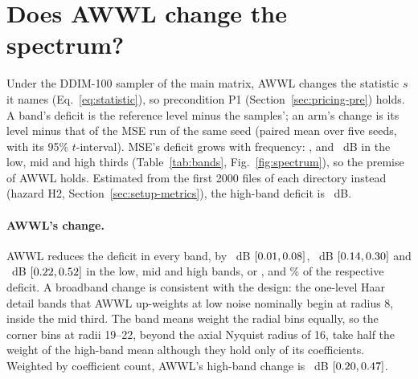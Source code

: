 \section{Does AWWL change the spectrum?}
\label{sec:mechanism}

Under the DDIM-100 sampler of the main matrix, AWWL changes the statistic $s$
it names (Eq.~\eqref{eq:statistic}), so precondition P1
(Section~\ref{sec:pricing-pre}) holds. A band's deficit is the reference
level minus the samples'; an arm's change is its level minus that of the MSE
run of the same seed (paired mean over five seeds, with its 95\%
$t$-interval). MSE's deficit grows with frequency: ,
 and ~dB in the low, mid and high thirds
(Table~\ref{tab:bands}, Fig.~\ref{fig:spectrum}), so the premise of AWWL
holds. Estimated from the first \num{2000} files of each directory instead
(hazard H2, Section~\ref{sec:setup-metrics}), the high-band deficit is
~dB.




\paragraph{AWWL's change.}
AWWL reduces the deficit in every band, by \corrLowAWWL~dB
$[0.01, 0.08]$, \corrMidAWWL~dB
$[0.14, 0.30]$ and \corrHighAWWL~dB
$[0.22, 0.52]$ in the low, mid and high bands, or
\shareLowAWWL, \shareMidAWWL{} and \shareHighAWWL\% of the respective
deficit. A broadband change is consistent with the design: the one-level Haar
detail bands that AWWL up-weights at low noise nominally begin at radius 8,
inside the mid third. The band means weight the radial bins equally,
so the corner bins at radii 19--22, beyond the axial Nyquist radius of 16,
take half the weight of the high-band mean although they hold only \nCoefCorner{} of
its \nCoefHigh{} coefficients. Weighted by coefficient count, AWWL's
high-band change is \corrHighWAWWL~dB $[0.20, 0.47]$.

